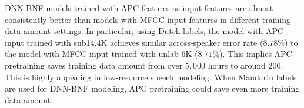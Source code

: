 \documentclass[a4paper]{article}
\begin{document}
DNN-BNF models trained with APC features as input features are almost consistently better than models with MFCC input features in different training data amount settings. 
In particular, using Dutch labels,  the model with APC input  trained with sub14.4K achieves similar across-speaker error rate ($8.78\%$)  to the model with MFCC input trained with unlab-6K ($8.71\%$). This implies  APC pretraining saves training data amount from over $5,000$ hours to around $200$. This is highly appealing in low-resource speech modeling. When Mandarin labels are used for DNN-BNF modeling, APC pretraining  could save even more training data amount. 






\end{document}
